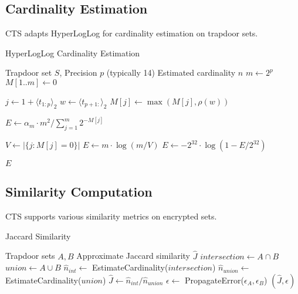 \documentclass[../main_comprehensive.tex]{subfiles}
\begin{document}
\subsection{Cardinality Estimation}

CTS adapts HyperLogLog for cardinality estimation on trapdoor sets.

\begin{algorithm}
\caption{HyperLogLog Cardinality Estimation}
\label{alg:hyperloglog}
\begin{algorithmic}[1]
\REQUIRE Trapdoor set $S$, Precision $p$ (typically 14)
\ENSURE Estimated cardinality $\hat{n}$
\STATE $m \leftarrow 2^p$ 
\STATE $M[1..m] \leftarrow 0$ 

  \STATE $j \leftarrow 1 + \langle t_{1:p} \rangle_2$ 
  \STATE $w \leftarrow \langle t_{p+1:} \rangle_2$ 
  \STATE $M[j] \leftarrow \max(M[j], \rho(w))$ 
\ENDFOR

\STATE $E \leftarrow \alpha_m \cdot m^2 / \sum_{j=1}^{m} 2^{-M[j]}$ 

 
  \STATE $V \leftarrow |\{j : M[j] = 0\}|$
    \STATE $E \leftarrow m \cdot \log(m/V)$ 
  \ENDIF
{} 
  \STATE $E \leftarrow -2^{32} \cdot \log(1 - E/2^{32})$
\ENDIF

\RETURN $E$
\end{algorithmic}
\end{algorithm}

\subsection{Similarity Computation}

CTS supports various similarity metrics on encrypted sets.

\begin{algorithm}
\caption{Jaccard Similarity}
\label{alg:jaccard}
\begin{algorithmic}[1]
\REQUIRE Trapdoor sets $A, B$
\ENSURE Approximate Jaccard similarity $\hat{J}$
\STATE $intersection \leftarrow A \cap B$
\STATE $union \leftarrow A \cup B$
\STATE $\hat{n}_{int} \leftarrow$ EstimateCardinality($intersection$)
\STATE $\hat{n}_{union} \leftarrow$ EstimateCardinality($union$)
\STATE $\hat{J} \leftarrow \hat{n}_{int} / \hat{n}_{union}$
\STATE $\epsilon \leftarrow$ PropagateError($\epsilon_A, \epsilon_B$)
\RETURN $(\hat{J}, \epsilon)$
\end{algorithmic}
\end{algorithm}
\end{document}
